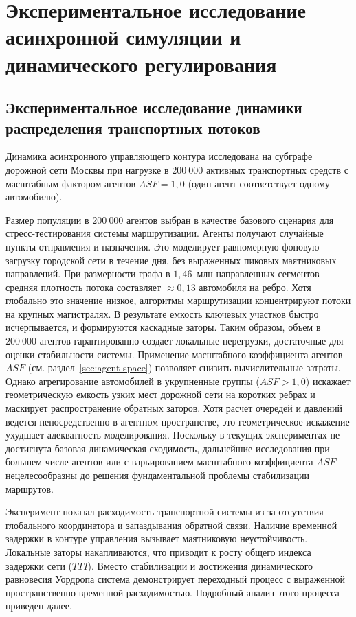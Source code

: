 \section{Экспериментальное исследование асинхронной симуляции и динамического регулирования}

\subsection{Экспериментальное исследование динамики распределения транспортных потоков}
Динамика асинхронного управляющего контура исследована на субграфе дорожной сети Москвы при нагрузке в $200~000$ активных транспортных средств с масштабным фактором агентов $ASF = 1{,}0$ (один агент соответствует одному автомобилю).

Размер популяции в $200~000$ агентов выбран в качестве базового сценария для стресс-тестирования системы маршрутизации. Агенты получают случайные пункты отправления и назначения. Это моделирует равномерную фоновую загрузку городской сети в течение дня, без выраженных пиковых маятниковых направлений. При размерности графа в $1{,}46$~млн направленных сегментов средняя плотность потока составляет $\approx 0{,}13$ автомобиля на ребро. Хотя глобально это значение низкое, алгоритмы маршрутизации концентрируют потоки на крупных магистралях. В результате емкость ключевых участков быстро исчерпывается, и формируются каскадные заторы. Таким образом, объем в $200~000$ агентов гарантированно создает локальные перегрузки, достаточные для оценки стабильности системы. Применение масштабного коэффициента агентов $ASF$ (см. раздел~\ref{sec:agent-space}) позволяет снизить вычислительные затраты. Однако агрегирование автомобилей в укрупненные группы ($ASF > 1{,}0$) искажает геометрическую емкость узких мест дорожной сети на коротких ребрах и маскирует распространение обратных заторов. Хотя расчет очередей и давлений ведется непосредственно в агентном пространстве, это геометрическое искажение ухудшает адекватность моделирования. Поскольку в текущих экспериментах не достигнута базовая динамическая сходимость, дальнейшие исследования при большем числе агентов или с варьированием масштабного коэффициента $ASF$ нецелесообразны до решения фундаментальной проблемы стабилизации маршрутов.

Эксперимент показал расходимость транспортной системы из-за отсутствия глобального координатора и запаздывания обратной связи. Наличие временной задержки в контуре управления вызывает маятниковую неустойчивость. Локальные заторы накапливаются, что приводит к росту общего индекса задержки сети ($TTI$). Вместо стабилизации и достижения динамического равновесия Уордропа система демонстрирует переходный процесс с выраженной пространственно-временной расходимостью. Подробный анализ этого процесса приведен далее.


